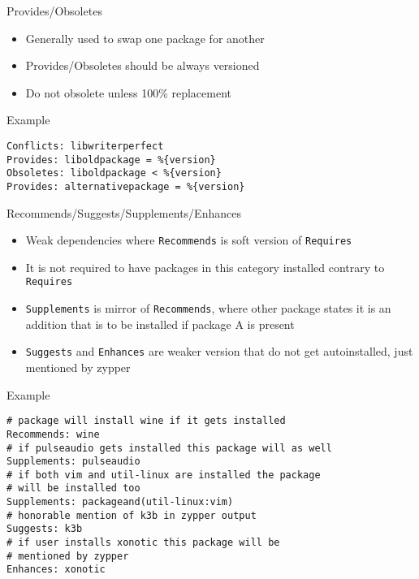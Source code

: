 \documentclass{beamer}
\begin{document}
\begin{frame}[t]{Provides/Obsoletes}
	\begin{itemize}
	\item Generally used to swap one package for another
    \item Provides/Obsoletes should be always versioned
    \item Do not obsolete unless 100\% replacement
	\end{itemize}
\end{frame}

\begin{frame}[fragile]{Example}
	\begin{small}
\begin{verbatim}
Conflicts: libwriterperfect
Provides: liboldpackage = %{version}
Obsoletes: liboldpackage < %{version}
Provides: alternativepackage = %{version}
\end{verbatim}
	\end{small}
\end{frame}

\begin{frame}[t]{Recommends/Suggests/Supplements/Enhances}
	\begin{itemize}
	\item Weak dependencies where \texttt{Recommends} is soft version of \texttt{Requires}
    \item It is not required to have packages in this category installed contrary to \texttt{Requires}
    \item \texttt{Supplements} is mirror of \texttt{Recommends}, where other package states it is an addition that is to be installed if package A is present
    \item \texttt{Suggests} and \texttt{Enhances} are weaker version that do not get autoinstalled, just mentioned by zypper
	\end{itemize}
\end{frame}

\begin{frame}[fragile]{Example}
	\begin{small}
\begin{verbatim}
# package will install wine if it gets installed
Recommends: wine
# if pulseaudio gets installed this package will as well
Supplements: pulseaudio
# if both vim and util-linux are installed the package
# will be installed too
Supplements: packageand(util-linux:vim)
# honorable mention of k3b in zypper output
Suggests: k3b
# if user installs xonotic this package will be
# mentioned by zypper
Enhances: xonotic
\end{verbatim}
	\end{small}
\end{frame}
\end{document}
